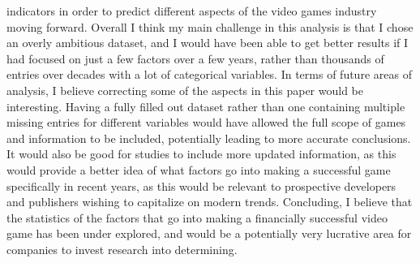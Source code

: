 \documentclass[12pt]{article}
\begin{document}
indicators in order to predict different aspects of the video games industry moving forward.
Overall I think my main challenge in this analysis is that I chose an overly ambitious dataset, and I would have been able to get better results if I had focused on just a few factors over a few years, rather than thousands of entries over decades with a lot of categorical variables.
In terms of future areas of analysis, I believe correcting some of the aspects in this paper would be interesting. Having a fully filled
out dataset rather than one containing multiple missing entries for different variables would have allowed the full scope of games and information to be included, 
potentially leading to more accurate conclusions. It would also be good for studies to include more updated information, as this would provide a better idea
of what factors go into making a successful game specifically in recent years, as this would be relevant to prospective developers and publishers wishing to capitalize on modern trends.
Concluding, I believe that the statistics of the factors that go into making a financially successful video game has been under explored, 
and would be a potentially very lucrative area for companies to invest research into determining.




\end{document}
